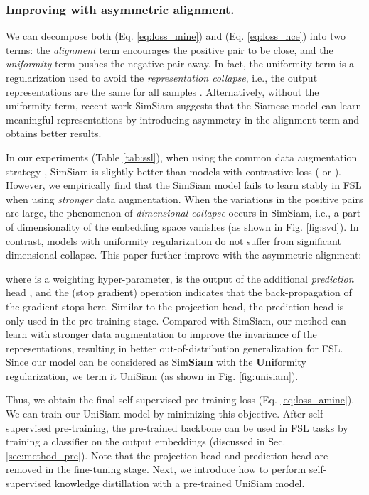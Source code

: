 \documentclass[runningheads]{llncs}
\begin{document}
\subsubsection{Improving  with asymmetric alignment.}
We can decompose both  (Eq. \ref{eq:loss_mine}) and  (Eq. \ref{eq:loss_nce}) into two terms: the \emph{alignment} term encourages the positive pair to be close, and the \emph{uniformity} term pushes the negative pair away.
In fact, the uniformity term is a regularization used to avoid the \textit{representation collapse}, i.e., the output representations are the same for all samples \cite{wang2020understanding}.
Alternatively, without the uniformity term, recent work SimSiam \cite{chen2020exploring} suggests that the Siamese model can learn meaningful representations by introducing asymmetry in the alignment term and obtains better results.

In our experiments (Table \ref{tab:ssl}), when using the common data augmentation strategy \cite{chen2020improved,chen2020exploring}, SimSiam is slightly better than models with contrastive loss ( or ).
However, we empirically find that the SimSiam model fails to learn stably in FSL when using \emph{stronger} data augmentation.
When the variations in the positive pairs are large, the phenomenon of \emph{dimensional collapse} \cite{Jing2021UnderstandingDC} occurs in SimSiam, i.e., a part of dimensionality of the embedding space vanishes (as shown in Fig. \ref{fig:svd}).
In contrast, models with uniformity regularization do not suffer from significant dimensional collapse.
This paper further improve  with the asymmetric alignment:
\begin{footnotesize}

\end{footnotesize}

\noindent where  is a weighting hyper-parameter,  is the output of the additional \emph{prediction} head  \cite{chen2020exploring}, and the  (stop gradient) operation indicates that the back-propagation of the gradient stops here.
Similar to the projection head, the prediction head is only used in the pre-training stage.
Compared with SimSiam, our method can learn with stronger data augmentation to improve the invariance of the representations, resulting in better out-of-distribution generalization for FSL. 
Since our model can be considered as Sim\textbf{Siam} with the \textbf{Uni}formity regularization,  we term it UniSiam (as shown in Fig. \ref{fig:unisiam}).

Thus, we obtain the final self-supervised pre-training loss  (Eq. \ref{eq:loss_amine}). 
We can train our UniSiam model by minimizing this objective.
After self-supervised pre-training, the pre-trained backbone can be used in FSL tasks by training a classifier on the output embeddings (discussed in Sec. \ref{sec:method_pre}). 
Note that the projection head and prediction head are removed in the fine-tuning stage.
Next, we introduce how to perform self-supervised knowledge distillation with a pre-trained UniSiam model.
\end{document}
